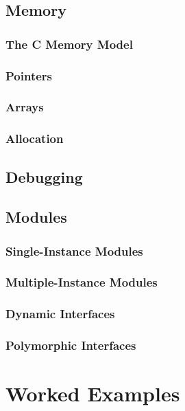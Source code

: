 \documentclass[a4paper,10pt]{report}
\begin{document}
\chapter{Memory}

\section{The C Memory Model}

\section{Pointers}

\section{Arrays}

\section{Allocation}

\chapter{Debugging}

\chapter{Modules}

\section{Single-Instance Modules}

\section{Multiple-Instance Modules}

\section{Dynamic Interfaces}

\section{Polymorphic Interfaces}

\part{Worked Examples}
\end{document}
